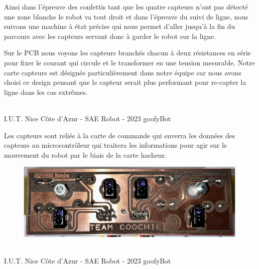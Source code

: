 Ainsi dans l’épreuve des confettis tant que les quatre capteurs n’ont pas détecté une zone blanche le robot va tout droit et dans l’épreuve du suivi de ligne, nous suivons une machine à état précise qui nous permet d’aller jusqu'à la fin du parcours avec les capteurs servant donc à garder le robot sur la ligne.


Sur le PCB nous voyons les capteurs branchés chacun à deux résistances en série pour fixer le courant qui circule et le transformer en une tension mesurable.
Notre carte capteurs est désignée particulièrement dans notre équipe car nous avons choisi ce design pensant que le capteur serait plus performant pour re-capter la ligne dans les cas extrêmes.

\vfill
\noindent\makebox[\linewidth]{\rule{.8\paperwidth}{.6pt}}\\[0.2cm]
I.U.T. Nice Côte d'Azur - SAE Robot - 2023 \hfill goofyBot
\noindent\makebox[\linewidth]{\rule{.8\paperwidth}{.6pt}}
\newpage

Les capteurs sont reliés à la carte de commande qui enverra les données des capteurs au microcontrôleur qui traitera les informations pour agir sur le mouvement du robot par le biais de la carte hacheur.

\begin{figure}[H]
\centering
\begin{minipage}{.5\textwidth}
  \centering
  \centerline{\includegraphics[width=1.5\linewidth]{img/cartes/capteur.jpeg}}
  \label{fig:cartecapteurs}
\end{minipage}%
\end{figure}

\vfill
\noindent\makebox[\linewidth]{\rule{.8\paperwidth}{.6pt}}\\[0.2cm]
I.U.T. Nice Côte d'Azur - SAE Robot - 2023 \hfill goofyBot
\noindent\makebox[\linewidth]{\rule{.8\paperwidth}{.6pt}}
\newpage





